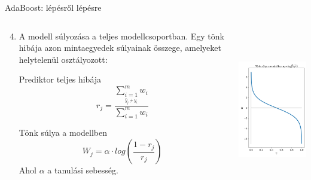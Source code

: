 \documentclass[english, aspectratio=169]{beamer}
\begin{document}
\begin{frame}{AdaBoost: lépésről lépésre}
\begin{columns}
\begin{column}{.5\textwidth}
\begin{enumerate}
	\setcounter{enumi}{3}
	\item A modell súlyozása a teljes modellcsoportban. Egy tönk hibája azon mintaegyedek súlyainak összege, amelyeket helytelenül osztályozott:
	\begin{block}{Prediktor teljes hibája}
	\[
	r_j = \frac{\sum_{\underset{\hat{y}_j \neq y_i}{i=1}}^m w_i}{\sum_{i=1}^m w_i}
	\]
	\end{block}
	\begin{block}{Tönk súlya a modellben}
	\[
	W_j = \alpha \cdot log \left( \frac{1-r_j}{r_j} \right)
	\]
	Ahol $\alpha$ a tanulási sebesség.
	\end{block}
\end{enumerate}
\end{column}
\begin{column}{.5\textwidth}
\begin{center}
\includegraphics[width=7cm, height=7cm, keepaspectratio]{images/ensemble_6.png}
\end{center}
\end{column}
\end{columns}
\end{frame}
\end{document}
